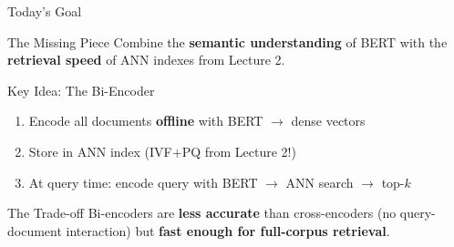 \documentclass[aspectratio=169]{beamer}
\newif\ifanimated
\newcommand{\cpause}{\ifanimated\pause\fi}
\begin{document}
\begin{frame}{Today's Goal}
\begin{exampleblock}{The Missing Piece}
Combine the \textbf{semantic understanding} of BERT with the \textbf{retrieval speed} of ANN indexes from Lecture 2.
\end{exampleblock}

\vspace{1em}

\begin{block}{Key Idea: The Bi-Encoder}
\begin{enumerate}
    \item Encode all documents \textbf{offline} with BERT $\to$ dense vectors
    \item Store in ANN index (IVF+PQ from Lecture 2!)
    \item At query time: encode query with BERT $\to$ ANN search $\to$ top-$k$
\end{enumerate}
\end{block}

\cpause
\vspace{0.5em}

\begin{alertblock}{The Trade-off}
Bi-encoders are \textbf{less accurate} than cross-encoders (no query-document interaction) but \textbf{fast enough for full-corpus retrieval}.
\end{alertblock}
\end{frame}
\end{document}
